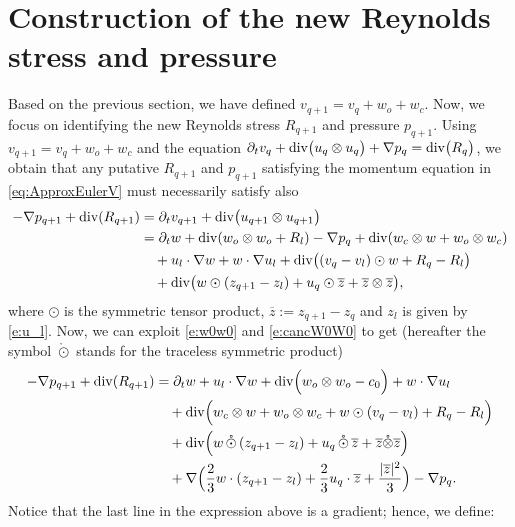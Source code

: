 \documentclass[10pt,a4paper]{amsart}
\numberwithin{equation}{section}
\numberwithin{corollario}{section}
\numberwithin{lemma}{section}
\numberwithin{prop}{section}
\theoremstyle{definition}
\theoremstyle{remark}
\newcommand{\dvg}{\mathord{{\rm div}}}
\newcommand{\varz}{\overline{z}}
\newcommand{\qq}{_{q+1}}
\newcommand{\SymOt}{\odot}
\newcommand{\SymOtNoTr}{\,\mathring{\odot}\,}
\begin{document}
\section{Construction of the new Reynolds stress and pressure} \label{sec:new_reynolds}
Based on the previous section, we have defined $v\qq=v_q+w_o+w_c$. Now, we focus on identifying the new Reynolds stress $R\qq$ and pressure $ p\qq$.
Using $v\qq=v_q+w_o+w_c$ and the equation $\partial_tv_q+\dvg\big(u_q\otimes u_q\big)+\nabla p_q=\dvg\big(R_q\big)$, 
we obtain that any putative $R\qq$ and $p\qq$ satisfying the momentum equation in \eqref{eq:ApproxEulerV} must necessarily satisfy also
\begin{equation}
    \begin{aligned}
        -\nabla p\qq+\dvg(R\qq) 
        &=
        \partial_tv\qq+\dvg\big(u\qq\otimes u\qq\big)
        \\
        &=
        \partial_t w+ \dvg(w_o\otimes w_o+R_l)-\nabla p_q+\dvg(w_c\otimes w+w_o\otimes w_c)
        \\
        &\quad+
        u_l\cdot \nabla w+w\cdot \nabla u_l+\dvg\big((v_q-v_l)\SymOt w+R_q-R_l\big)
        \\
        &\quad+
        \dvg\big(w\SymOt (z\qq-z_l)+u_q\SymOt \varz+\varz\otimes \varz\big),
    \end{aligned}
\end{equation}
where $\SymOt$ is the symmetric tensor product, $\varz:=z\qq-z_q$ and $z_l$ is given by \eqref{e:u_l}.
Now, we can exploit \eqref{e:w0w0}  and \eqref{e:cancW0W0}  to get (hereafter the symbol $\mathring{\odot}$ stands for the traceless symmetric product)
\begin{equation} \label{eq:decomposition_Rqq}
    \begin{aligned}
        -\nabla p\qq+\dvg(R\qq)
        &=
        \partial_t w+u_l\cdot \nabla w+\dvg\Big(w_o\otimes w_o-c_0\Big)+w\cdot \nabla u_l
        \\
        &\quad+
        \dvg\Big(w_c\otimes w+w_o\otimes w_c+w\SymOt (v_q-v_l)+R_q-R_l\Big)
        \\
        &\quad+ 
        \dvg\Big(w \SymOtNoTr (z\qq-z_l)+u_q\SymOtNoTr\varz+\varz\mathring{\otimes} \varz\Big)
        \\
        &\quad+
        \nabla \Big(\frac{2}{3}w\cdot (z\qq-z_l)+\frac{2}{3}u_q\cdot \varz +\frac{|\varz|^2}{3}\Big)-\nabla p_q.
    \end{aligned}
\end{equation}
Notice that the last line in the expression above is a gradient; hence, we define:
\end{document}
